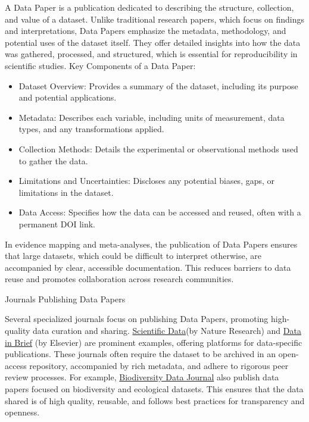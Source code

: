 \documentclass[
]{book}
\providecommand{\tightlist}{%
  \setlength{\itemsep}{0pt}\setlength{\parskip}{0pt}}
\begin{document}
A Data Paper is a publication dedicated to describing the structure, collection, and value of a dataset.
Unlike traditional research papers, which focus on findings and interpretations, Data Papers emphasize the metadata, methodology, and potential uses of the dataset itself.
They offer detailed insights into how the data was gathered, processed, and structured, which is essential for reproducibility in scientific studies.
Key Components of a Data Paper:

\begin{itemize}
\tightlist
\item
  Dataset Overview: Provides a summary of the dataset, including its purpose and potential applications.\\
\item
  Metadata: Describes each variable, including units of measurement, data types, and any transformations applied.\\
\item
  Collection Methods: Details the experimental or observational methods used to gather the data.\\
\item
  Limitations and Uncertainties: Discloses any potential biases, gaps, or limitations in the dataset.\\
\item
  Data Access: Specifies how the data can be accessed and reused, often with a permanent DOI link.
\end{itemize}

In evidence mapping and meta-analyses, the publication of Data Papers ensures that large datasets, which could be difficult to interpret otherwise, are accompanied by clear, accessible documentation.
This reduces barriers to data reuse and promotes collaboration across research communities.

Journals Publishing Data Papers

Several specialized journals focus on publishing Data Papers, promoting high-quality data curation and sharing.
\href{https://www.nature.com/sdata/}{Scientific Data}(by Nature Research) and \href{https://www.sciencedirect.com/journal/data-in-brief}{Data in Brief} (by Elsevier) are prominent examples, offering platforms for data-specific publications.
These journals often require the dataset to be archived in an open-access repository, accompanied by rich metadata, and adhere to rigorous peer review processes.
For example, \href{https://bdj.pensoft.net/}{Biodiversity Data Journal} also publish data papers focused on biodiversity and ecological datasets.
This ensures that the data shared is of high quality, reusable, and follows best practices for transparency and openness.
\end{document}
